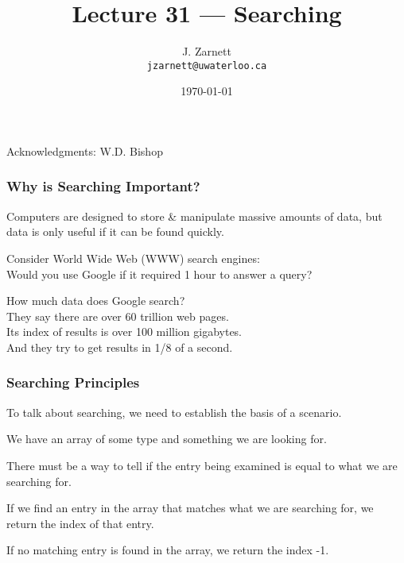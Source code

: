 

\title{Lecture 31 --- Searching }

\author{J. Zarnett\\
\texttt{jzarnett@uwaterloo.ca}}
\date{\today}



\begin{frame}
  \titlepage
  
  \begin{center}
  \small{Acknowledgments: W.D. Bishop}
  \end{center}
\end{frame}


\begin{frame}
\frametitle{Why is Searching Important?}

Computers are designed to store \& manipulate massive amounts of data, but data is only useful if it can be found quickly.

Consider World Wide Web (WWW) search engines:\\
\quad Would you use Google if it required 1 hour to answer a query?

How much data does Google search?\\
\quad They say there are over 60 trillion web pages.\\
\quad Its index of results is over 100 million gigabytes.\\
\quad And they try to get results in 1/8 of a second. 
\end{frame}

\begin{frame}
\frametitle{Searching Principles}
To talk about searching, we need to establish the basis of a scenario.

We have an array of some type and something we are looking for.

There must be a way to tell if the entry being examined is equal to what we are searching for.

If we find an entry in the array that matches what we are searching for, we return the index of that entry.

If no matching entry is found in the array, we return the index -1.

\end{frame}


